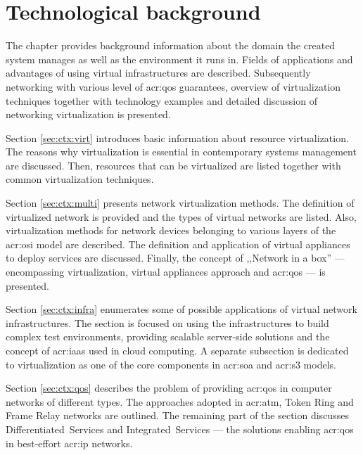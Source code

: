 \documentclass[11pt]{book}
\begin{document}
  \chapter{Technological background}
  \label{chap:bck}

    The chapter provides background information about the domain the created system manages as well as the environment
    it runs in.  Fields of applications and advantages of using virtual infrastructures are described. 
    Subsequently networking with various level of \gls{acr:qos} guarantees, overview of
    virtualization techniques together with technology examples and detailed discussion of networking virtualization
    is presented.

    Section \ref{sec:ctx:virt} introduces basic information about resource virtualization. The reasons why
    virtualization is essential in contemporary systems management are discussed. Then, resources that can be
    virtualized are listed together with common virtualization techniques.

    Section \ref{sec:ctx:multi} presents network virtualization methods. The definition of virtualized network is
    provided and the types of virtual networks are listed. Also, virtualization methods for network devices belonging to
    various layers of the \gls{acr:osi} model are described. The definition and application of virtual appliances to
    deploy services are discussed. Finally, the concept of ,,Network in a box'' --- encompassing virtualization, virtual
    appliances approach and \gls{acr:qos} --- is presented.

    Section \ref{sec:ctx:infra} enumerates some of possible applications of virtual network infrastructures. The section
    is focused on using the infrastructures to build complex test environments, providing scalable server-side solutions
    and the concept of \gls{acr:iaas} used in cloud computing. A separate subsection is dedicated to virtualization as
    one of the core components in \gls{acr:soa} and \gls{acr:s3} models.

    Section \ref{sec:ctx:qos} describes the problem of providing \gls{acr:qos} in computer networks of different types.
    The approaches adopted in \gls{acr:atm}, Token Ring and Frame Relay networks are outlined. The remaining part of the
    section discusses Differentiated~Services and Integrated~Services --- the solutions enabling \gls{acr:qos} in
    best-effort \gls{acr:ip} networks.

\end{document}
